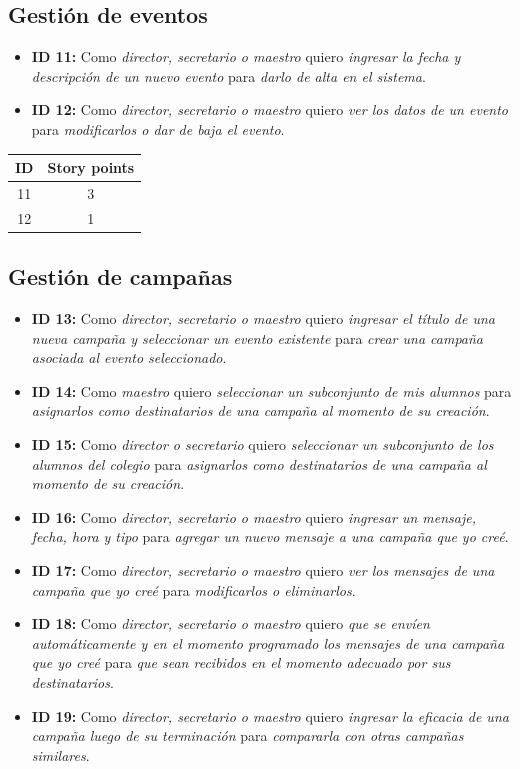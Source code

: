 \documentclass[a4paper, 10pt, twoside]{article}
\newenvironment{stories}{
  \begin{itemize}
}{
  \end{itemize}
}
\newcommand{\story}[4]{
  \item
  \textbf{ID #1:} Como \emph{#2} quiero \emph{#3} para \emph{#4}.
}
\begin{document}
\subsection{Gestión de eventos}

\begin{stories}
  \story{11}{director, secretario o maestro}
        {ingresar la fecha y descripción de un nuevo evento}
        {darlo de alta en el sistema} 

  \story{12}{director, secretario o maestro}
        {ver los datos de un evento}
        {modificarlos o dar de baja el evento} 
\end{stories}

\begin{center}
\begin{tabular}{|c|c|}
\hline
ID & Story points\\
\hline
11 & 3\\
12 & 1\\
\hline
\end{tabular}
\end{center}

\subsection{Gestión de campañas}

\begin{stories}
  \story{13}{director, secretario o maestro}
        {ingresar el título de una nueva campaña y seleccionar un evento existente}
        {crear una campaña asociada al evento seleccionado} 

  \story{14}{maestro}
        {seleccionar un subconjunto de mis alumnos}
        {asignarlos como destinatarios de una campaña al momento de su creación} 

  \story{15}{director o secretario}
        {seleccionar un subconjunto de los alumnos del colegio}
        {asignarlos como destinatarios de una campaña al momento de su creación} 

  \story{16}{director, secretario o maestro}
        {ingresar un mensaje, fecha, hora y tipo}
        {agregar un nuevo mensaje a una campaña que yo creé} 

  \story{17}{director, secretario o maestro}
        {ver los mensajes de una campaña que yo creé} 
        {modificarlos o eliminarlos}

  \story{18}{director, secretario o maestro}
        {que se envíen automáticamente y en el momento programado los mensajes de una campaña que yo creé}
        {que sean recibidos en el momento adecuado por sus destinatarios} 

  \story{19}{director, secretario o maestro}
        {ingresar la eficacia de una campaña luego de su terminación}
        {compararla con otras campañas similares} 
\end{stories}
\end{document}
